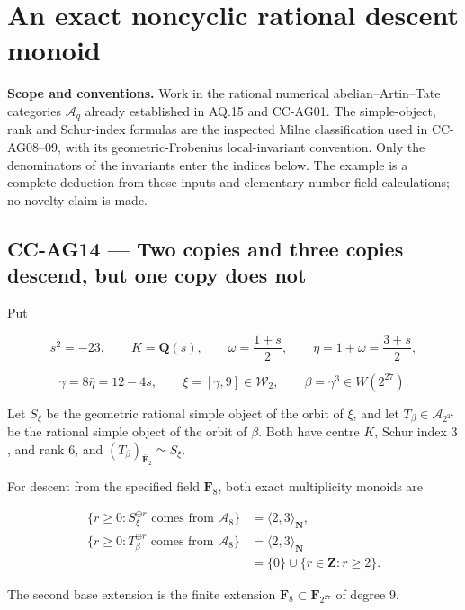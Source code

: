 \section{An exact noncyclic rational descent
monoid}\label{an-exact-noncyclic-rational-descent-monoid}

\textbf{Scope and conventions.} Work in the rational numerical
abelian--Artin--Tate categories \(\mathcal A_q\) already established in
AQ.15 and CC-AG01. The simple-object, rank and Schur-index formulas are
the inspected Milne classification used in CC-AG08--09, with its
geometric-Frobenius local-invariant convention. Only the denominators of
the invariants enter the indices below. The example is a complete
deduction from those inputs and elementary number-field calculations; no
novelty claim is made.

\subsection{CC-AG14 --- Two copies and three copies descend, but one
copy does
not}\label{cc-ag14-two-copies-and-three-copies-descend-but-one-copy-does-not}

Put

\[
 s^2=-23,\qquad K=\mathbf Q(s),\qquad
 \omega=\frac{1+s}{2},\qquad
 \eta=1+\omega=\frac{3+s}{2},
\]

\[
 \gamma=8\bar\eta=12-4s,\qquad
 \xi=[\gamma,9]\in\mathcal W_2,\qquad
 \beta=\gamma^3\in W(2^{27}).
 \tag{CC-AG.96}
\]

Let \(S_\xi\) be the geometric rational simple object of the orbit of
\(\xi\), and let \(T_\beta\in\mathcal A_{2^{27}}\) be the rational
simple object of the orbit of \(\beta\). Both have centre \(K\), Schur
index \(3\), and rank \(6\), and
\((T_\beta)_{\bar{\mathbf F}_2}\simeq S_\xi\).

For descent from the specified field \(\mathbf F_8\), both exact
multiplicity monoids are

\[
 \begin{aligned}
 \{r\ge0:S_\xi^{\oplus r}
          \text{ comes from }\mathcal A_8\}
 &=\langle2,3\rangle_{\mathbf N},\\
 \{r\ge0:T_\beta^{\oplus r}
          \text{ comes from }\mathcal A_8\}
 &=\langle2,3\rangle_{\mathbf N}\\
 &=\{0\}\cup\{r\in\mathbf Z:r\ge2\}.
 \end{aligned}
 \tag{CC-AG.97}
\]

The second base extension is the finite extension
\(\mathbf F_8\subset\mathbf F_{2^{27}}\) of degree \(9\).

